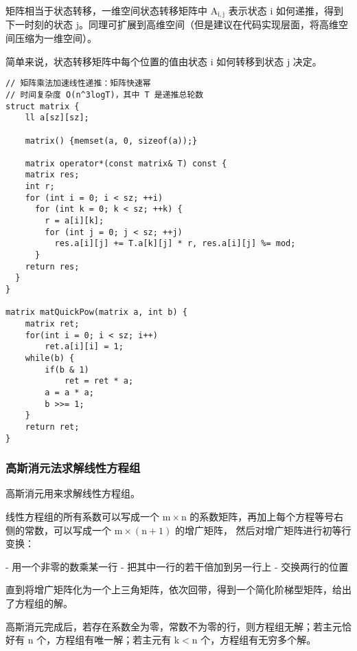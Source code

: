 \documentclass[UTF8]{article}
\begin{document}
矩阵相当于状态转移，一维空间状态转移矩阵中 $\mathrm{A_{i,j}}$ 表示状态 $\mathrm{i}$ 如何递推，得到下一时刻的状态 $\mathrm{j}$。同理可扩展到高维空间（但是建议在代码实现层面，将高维空间压缩为一维空间）。

简单来说，状态转移矩阵中每个位置的值由状态 $\mathrm{i}$ 如何转移到状态 $\mathrm{j}$ 决定。
\begin{lstlisting}[caption=矩阵快速幂]
// 矩阵乘法加速线性递推：矩阵快速幂
// 时间复杂度 O(n^3logT)，其中 T 是递推总轮数
struct matrix {
	ll a[sz][sz];
	
	matrix() {memset(a, 0, sizeof(a));}
	
	matrix operator*(const matrix& T) const {
    matrix res;
    int r;
    for (int i = 0; i < sz; ++i)
      for (int k = 0; k < sz; ++k) {
        r = a[i][k];
        for (int j = 0; j < sz; ++j)
          res.a[i][j] += T.a[k][j] * r, res.a[i][j] %= mod;
      }
    return res;
  }
}

matrix matQuickPow(matrix a, int b) {
	matrix ret;
	for(int i = 0; i < sz; i++)
		ret.a[i][i] = 1;
	while(b) {
		if(b & 1)
			ret = ret * a;
		a = a * a;
		b >>= 1;
	}
	return ret;
}
\end{lstlisting}


\subsubsection{高斯消元法求解线性方程组}
高斯消元用来求解线性方程组。

线性方程组的所有系数可以写成一个 $\mathrm{m \times n}$ 的系数矩阵，再加上每个方程等号右侧的常数，可以写成一个 $\mathrm{m \times (n + 1)}$ 的增广矩阵， 然后对增广矩阵进行初等行变换：

- 用一个非零的数乘某一行
- 把其中一行的若干倍加到另一行上
- 交换两行的位置

直到将增广矩阵化为一个上三角矩阵，依次回带，得到一个简化阶梯型矩阵，给出了方程组的解。

高斯消元完成后，若存在系数全为零，常数不为零的行，则方程组无解；若主元恰好有 $\mathrm{n}$ 个，方程组有唯一解；若主元有 $\mathrm{k < n}$ 个，方程组有无穷多个解。
\end{document}
